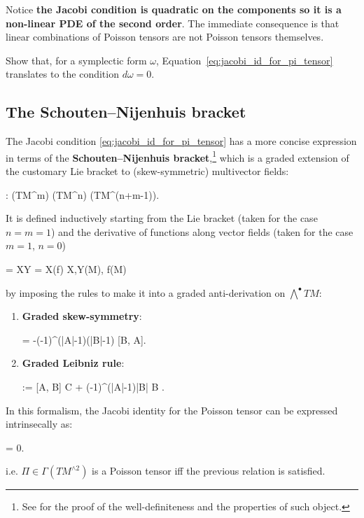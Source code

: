 \documentclass[main.tex]{subfiles}
\begin{document}
\begin{remark}
	Notice \textbf{the Jacobi condition is quadratic on the components so it is a non-linear PDE of the second order}. The immediate consequence is that linear combinations of Poisson tensors are not Poisson tensors themselves.
\end{remark}

\begin{exercise}
	Show that, for a symplectic form $\omega$, Equation~\eqref{eq:jacobi_id_for_pi_tensor} translates to the condition $d\omega = 0$.
\end{exercise}

\subsection{The Schouten--Nijenhuis bracket}
The Jacobi condition \eqref{eq:jacobi_id_for_pi_tensor} has a more concise expression in terms of the \textbf{Schouten--Nijenhuis bracket},\footnote{See \cite[Section 33.2]{michor2008} for the proof of the well-definiteness and the properties of such object.} which is a graded extension of the customary Lie bracket to (skew-symmetric) multivector fields:
\begin{eqalign}
	[\bullet, \bullet] : \Gamma(TM^{\wedge m}) \times \Gamma(TM^{\wedge n}) \longto \Gamma(TM^{\wedge (n+m-1)}).
\end{eqalign}
It is defined inductively starting from the Lie bracket (taken for the case $n=m=1$) and the derivative of functions along vector fields (taken for the case $m=1$, $n=0$) 
\begin{eqalign}
	[X,Y] = \Lie XY \quad {} \quad [X, f] = X(f) \quad \forall X,Y\in\fields(M), f\in\Cinfty(M)
\end{eqalign}
by imposing the rules to make it into a graded anti-derivation on $\bigwedge^\bullet TM$:
\begin{enumerate}
	\item \textbf{Graded skew-symmetry}:
	\begin{eqalign}
		[A,B] = -(-1)^{(|A|-1)(|B|-1)} [B, A].
	\end{eqalign}
	\item \textbf{Graded Leibniz rule}:
	\begin{eqalign}
		[A,B \wedge C] := [A, B] \wedge C + (-1)^{(|A|-1)|B|} B \wedge [A,C].
	\end{eqalign}
\end{enumerate}

In this formalism, the Jacobi identity for the Poisson tensor can be expressed intrinsecally as:
\begin{eqalign}
	[\Pi, \Pi] = 0.
\end{eqalign}
i.e. $\Pi\in\Gamma(TM^{\wedge2})$ is a Poisson tensor iff the previous relation is satisfied.
\end{document}

